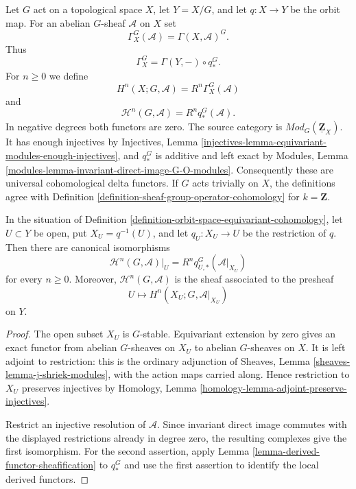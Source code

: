 \begin{definition}
\label{definition-orbit-space-equivariant-cohomology}
\begin{reference}
\cite[Chapter V, \S 5.2, pp. 199--200]{Tohoku}
\end{reference}
Let $G$ act on a topological space $X$, let $Y = X/G$, and let
$q : X \to Y$ be the orbit map. For an abelian $G$-sheaf $\mathcal{A}$
on $X$ set
$$
\Gamma_X^G(\mathcal{A}) = \Gamma(X, \mathcal{A})^G.
$$
Thus
$$
\Gamma_X^G = \Gamma(Y, -) \circ q_*^G.
$$
For $n \geq 0$ we define
$$
H^n(X; G, \mathcal{A}) = R^n\Gamma_X^G(\mathcal{A})
$$
and
$$
\mathcal{H}^n(G, \mathcal{A}) = R^nq_*^G(\mathcal{A}).
$$
In negative degrees both functors are zero. The source category is
$\textit{Mod}_G(\underline{\mathbf{Z}}_X)$. It has enough injectives by
Injectives, Lemma
\ref{injectives-lemma-equivariant-modules-enough-injectives}, and $q_*^G$
is additive and left exact by Modules, Lemma
\ref{modules-lemma-invariant-direct-image-G-O-modules}. Consequently these
are universal cohomological delta functors. If $G$ acts trivially on $X$,
the definitions agree with Definition
\ref{definition-sheaf-group-operator-cohomology} for $k = \mathbf{Z}$.
\end{definition}

\begin{lemma}
\label{lemma-localize-higher-invariant-direct-image}
\begin{reference}
\cite[Chapter V, \S 5.2, Proposition 5.2.1, p. 200]{Tohoku}
\end{reference}
In the situation of Definition
\ref{definition-orbit-space-equivariant-cohomology}, let $U \subset Y$ be
open, put $X_U = q^{-1}(U)$, and let $q_U : X_U \to U$ be the restriction
of $q$. Then there are canonical isomorphisms
$$
\mathcal{H}^n(G, \mathcal{A})|_U
=
R^nq_{U,*}^G(\mathcal{A}|_{X_U})
$$
for every $n \geq 0$. Moreover, $\mathcal{H}^n(G, \mathcal{A})$ is the
sheaf associated to the presheaf
$$
U \longmapsto H^n(X_U; G, \mathcal{A}|_{X_U})
$$
on $Y$.
\end{lemma}

\begin{proof}
The open subset $X_U$ is $G$-stable. Equivariant extension by zero gives an
exact functor from abelian $G$-sheaves on $X_U$ to abelian $G$-sheaves on
$X$. It is left adjoint to restriction: this is the ordinary adjunction of
Sheaves, Lemma \ref{sheaves-lemma-j-shriek-modules}, with the action maps
carried along. Hence restriction to $X_U$ preserves injectives by Homology,
Lemma \ref{homology-lemma-adjoint-preserve-injectives}.

Restrict an injective resolution of $\mathcal{A}$. Since invariant direct
image commutes with the displayed restrictions already in degree zero, the
resulting complexes give the first isomorphism. For the second assertion,
apply Lemma \ref{lemma-derived-functor-sheafification} to $q_*^G$ and use
the first assertion to identify the local derived functors.
\end{proof}


